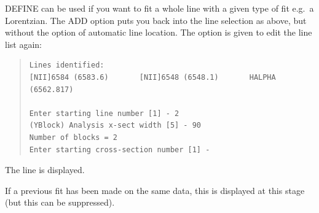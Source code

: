 DEFINE can be used if you want to fit a whole line with a given type of
fit e.g.\ a  Lorentzian.  The ADD option puts you back into the line
selection as above, but without the option of automatic line location.
The option is given to edit the line list again:

\begin{quote}\begin{verbatim}
Lines identified:
[NII]6584 (6583.6)       [NII]6548 (6548.1)       HALPHA (6562.817)
 
Enter starting line number [1] - 2
(YBlock) Analysis x-sect width [5] - 90
Number of blocks = 2
Enter starting cross-section number [1] -
\end{verbatim}\end{quote}

The line is displayed.

If a previous fit has been made on the same data, this is displayed
at this stage (but this can be suppressed).

